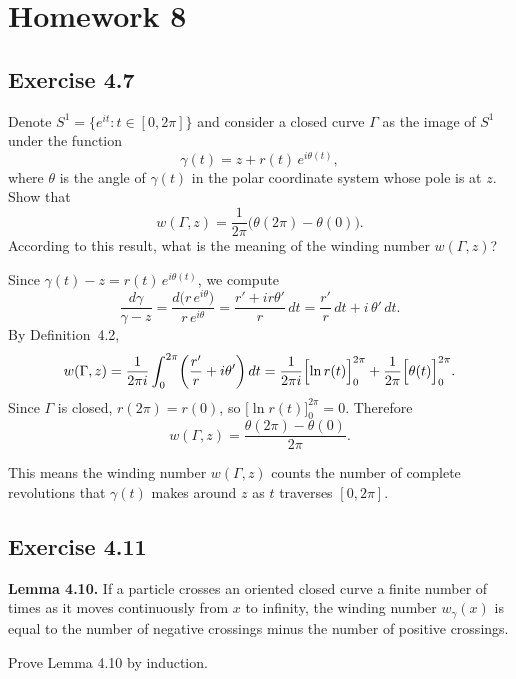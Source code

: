 \documentclass{article}
\begin{document}
\section{Homework 8}

\subsection{Exercise 4.7}

Denote $S^1 = \{e^{it} : t \in [0, 2\pi]\}$ and consider a closed curve
$\Gamma$ as the image of $S^1$ under the function
\[
  \gamma(t) = z + r(t)\,e^{i\theta(t)},
\]
where $\theta$ is the angle of $\gamma(t)$ in the polar coordinate system
whose pole is at $z$.  Show that
\[
  w(\Gamma, z) = \frac{1}{2\pi}\bigl(\theta(2\pi) - \theta(0)\bigr).
\]
According to this result, what is the meaning of the winding number
$w(\Gamma, z)$?

\begin{solution}
  Since $\gamma(t) - z = r(t)\,e^{i\theta(t)}$, we compute
  \[
    \frac{d\gamma}{\gamma - z}
    = \frac{d\bigl(r\,e^{i\theta}\bigr)}{r\,e^{i\theta}}
    = \frac{r' + ir\theta'}{r}\,dt
    = \frac{r'}{r}\,dt + i\,\theta'\,dt.
  \]
  By Definition~4.2,
  \[
    w(\Gamma, z)
    = \frac{1}{2\pi i}\int_0^{2\pi}
      \!\left(\frac{r'}{r} + i\theta'\right)dt
    = \frac{1}{2\pi i}\Bigl[\ln r(t)\Bigr]_0^{2\pi}
      + \frac{1}{2\pi}\Bigl[\theta(t)\Bigr]_0^{2\pi}.
  \]
  Since $\Gamma$ is closed, $r(2\pi) = r(0)$, so
  $\bigl[\ln r(t)\bigr]_0^{2\pi} = 0$.
  Therefore
  \[
    w(\Gamma, z) = \frac{\theta(2\pi) - \theta(0)}{2\pi}.
  \]

  This means the winding number $w(\Gamma, z)$ counts the number of
  complete revolutions that $\gamma(t)$ makes around $z$ as $t$ traverses
  $[0, 2\pi]$.\qedhere
\end{solution}

\subsection{Exercise 4.11}

\textbf{Lemma 4.10.}
If a particle crosses an oriented closed curve a finite number of times
as it moves continuously from $x$ to infinity, the winding number
$w_\gamma(x)$ is equal to the number of negative crossings minus the
number of positive crossings.

Prove Lemma 4.10 by induction.
\end{document}
